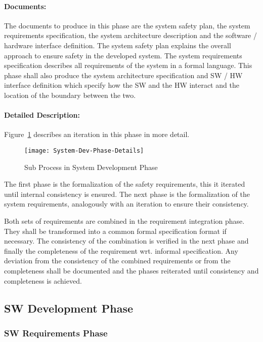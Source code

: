 \paragraph{Documents:}
\label{sec:sys-dev-documents}
The documents to produce in this phase are the system safety plan, the system
requirements specification, the system architecture description and the software
/ hardware interface definition. The system safety plan explains the overall
approach to ensure safety in the developed system. The system requirements
specification describes all requirements of the system in a formal
language. This phase shall also produce the system architecture specification
and SW / HW interface definition which specify how the SW and the HW interact
and the location of the boundary between the two.


\paragraph{Detailed Description:}
\label{sec:sys-dev-deta-descr}
Figure~\ref{fig:detailed-sys-dev-phase} describes an iteration in this phase in
more detail.

\begin{figure}[ht]
  \centering
  \texttt{[image: System-Dev-Phase-Details]}
  \caption{Sub Process in System Development Phase}
  \label{fig:detailed-sys-dev-phase}
\end{figure}

The first phase is the formalization of the safety requirements, this it
iterated until internal consistency is ensured. The next phase is the
formalization of the system requirements, analogously with an iteration to
ensure their consistency.

Both sets of requirements are combined in the requirement integration
phase. They shall be transformed into a common formal specification format if
necessary. The consistency of the combination is verified in the next phase and
finally the completeness of the requirement wrt. informal specification. Any
deviation from the consistency of the combined requirements or from the
completeness shall be documented and the phases reiterated until consistency and
completeness is achieved.


\subsection{SW Development Phase}
\label{sec:sw-development-phase}

\subsubsection{SW Requirements Phase}
\label{sec:sw-requ-phase}

